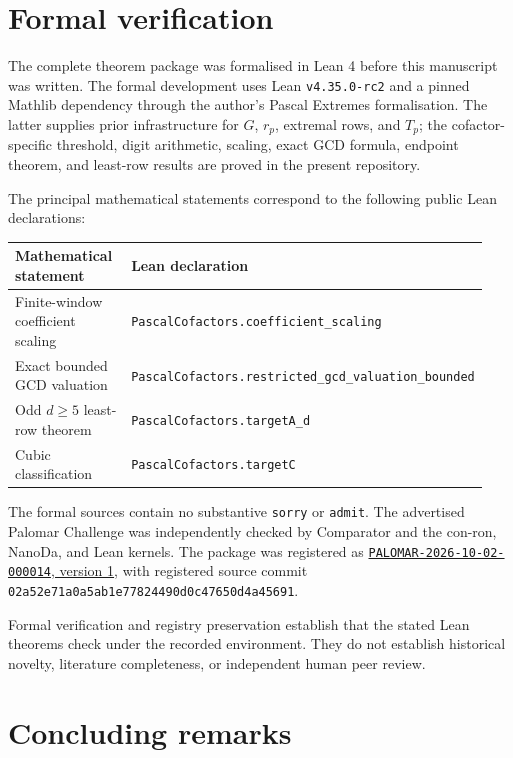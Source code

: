 \documentclass[11pt]{article}
\theoremstyle{definition}
\theoremstyle{remark}
\begin{document}
\section{Formal verification}\label{sec:formal}

The complete theorem package was formalised in Lean 4 before this manuscript
was written.  The formal development uses Lean
\texttt{v4.35.0-rc2} and a pinned Mathlib dependency through the author's
Pascal Extremes formalisation.  The latter supplies prior infrastructure for
\(G\), \(r_p\), extremal rows, and \(T_p\); the cofactor-specific threshold,
digit arithmetic, scaling, exact GCD formula, endpoint theorem, and least-row
results are proved in the present repository.

The principal mathematical statements correspond to the following public Lean
declarations:
\begin{center}
\begin{tabular}{@{}p{0.38\linewidth}p{0.56\linewidth}@{}}
\toprule
Mathematical statement & Lean declaration\\
\midrule
Finite-window coefficient scaling &
{\small\nolinkurl{PascalCofactors.coefficient_scaling}}\\
Exact bounded GCD valuation &
{\small\nolinkurl{PascalCofactors.restricted_gcd_valuation_bounded}}\\
Odd \(d\ge5\) least-row theorem &
{\small\nolinkurl{PascalCofactors.targetA_d}}\\
Cubic classification &
{\small\nolinkurl{PascalCofactors.targetC}}\\
\bottomrule
\end{tabular}
\end{center}

The formal sources contain no substantive \texttt{sorry} or \texttt{admit}.
The advertised Palomar Challenge was independently checked by Comparator and
the con-ron, NanoDa, and Lean kernels.  The package was registered as
\href{https://palomar-registry.org/entry.html?id=PALOMAR-2026-10-02-000014&version=1}
{\texttt{PALOMAR-2026-10-02-000014}, version 1},
with registered source commit
\texttt{02a52e71a0a5ab1e77824490d0c47650d4a45691}.

Formal verification and registry preservation establish that the stated Lean
theorems check under the recorded environment.  They do not establish
historical novelty, literature completeness, or independent human peer review.

\section{Concluding remarks}
\end{document}

